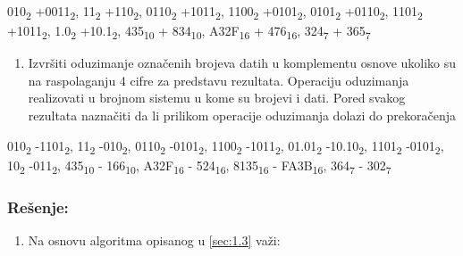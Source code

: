 \documentclass[a4paper,11pt]{article}
\numberwithin{equation}{section}
\begin{document}
010\textsubscript{2} +0011\textsubscript{2}, 11\textsubscript{2} +110\textsubscript{2}, 0110\textsubscript{2} +1011\textsubscript{2}, 1100\textsubscript{2} +0101\textsubscript{2}, 0101\textsubscript{2} +0110\textsubscript{2}, 1101\textsubscript{2} +1011\textsubscript{2}, 1.0\textsubscript{2} +10.1\textsubscript{2}, 435\textsubscript{10} + 834\textsubscript{10}, A32F\textsubscript{16} + 476\textsubscript{16}, 324\textsubscript{7} + 365\textsubscript{7}



\begin{enumerate}[label=\alph*),start=2,leftmargin=*]
\item Izvršiti oduzimanje označenih brojeva datih u komplementu osnove ukoliko su na raspolaganju 4 cifre za predstavu rezultata. Operaciju oduzimanja realizovati u brojnom sistemu u kome su brojevi i dati. Pored svakog rezultata naznačiti da li prilikom operacije oduzimanja dolazi do prekoračenja

\end{enumerate}


010\textsubscript{2} -1101\textsubscript{2}, 11\textsubscript{2} -010\textsubscript{2}, 0110\textsubscript{2} -0101\textsubscript{2}, 1100\textsubscript{2} -1011\textsubscript{2}, 01.01\textsubscript{2} -10.10\textsubscript{2}, 1101\textsubscript{2} -0101\textsubscript{2}, 10\textsubscript{2} -011\textsubscript{2}, 435\textsubscript{10} - 166\textsubscript{10}, A32F\textsubscript{16} - 524\textsubscript{16}, 8135\textsubscript{16} - FA3B\textsubscript{16}, 364\textsubscript{7} - 302\textsubscript{7}



\subsubsection*{Rešenje:}


\begin{enumerate}[label=\alph*),start=1,leftmargin=*]
\item Na osnovu algoritma opisanog u \ref{sec:1.3} važi:

\end{enumerate}
\end{document}
